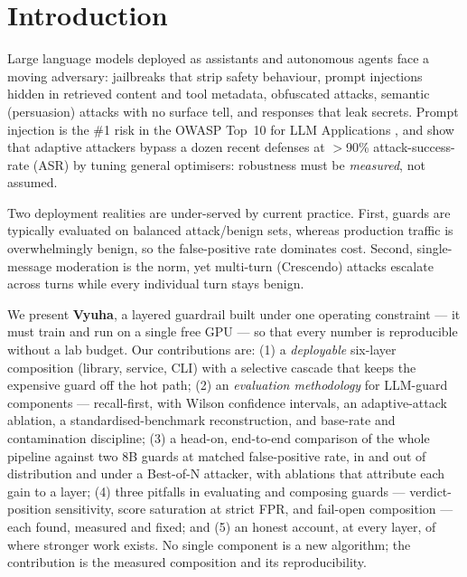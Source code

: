 \documentclass[11pt]{article}
\begin{document}
\section{Introduction}
Large language models deployed as assistants and autonomous agents face a moving adversary:
jailbreaks that strip safety behaviour, prompt injections hidden in retrieved content and tool
metadata, obfuscated attacks, semantic (persuasion) attacks with no surface tell,
and responses that leak secrets. Prompt injection is the \#1 risk in the OWASP Top~10 for LLM
Applications \citep{owasp-llm}, and \citet{attacker-second} show that adaptive attackers bypass a
dozen recent defenses at $>$90\% attack-success-rate (ASR) by tuning general optimisers: robustness
must be \emph{measured}, not assumed.

Two deployment realities are under-served by current practice. First, guards are typically evaluated
on balanced attack/benign sets, whereas production traffic is overwhelmingly benign, so the
false-positive rate dominates cost. Second, single-message moderation is the norm, yet multi-turn
(Crescendo) attacks \citep{crescendo} escalate across turns while every individual turn stays benign.

We present \textbf{Vyuha}, a layered guardrail built under one operating constraint --- it must train
and run on a single free GPU --- so that every number is reproducible without a lab budget. Our
contributions are: (1) a \emph{deployable} six-layer composition (library, service, CLI) with a
selective cascade that keeps the expensive guard off the hot path; (2) an \emph{evaluation
methodology} for LLM-guard components --- recall-first, with Wilson confidence intervals, an
adaptive-attack ablation, a standardised-benchmark reconstruction, and base-rate and contamination
discipline; (3) a head-on, end-to-end comparison of the whole pipeline against two 8B guards at matched
false-positive rate, in and out of distribution and under a Best-of-N attacker, with ablations that attribute each gain to a layer; (4) three pitfalls in evaluating and composing guards --- verdict-position sensitivity,
score saturation at strict FPR, and fail-open composition --- each found, measured and fixed; and (5) an
honest account, at every layer, of where stronger work exists. No single
component is a new algorithm; the contribution is the measured composition and its reproducibility.
\end{document}
